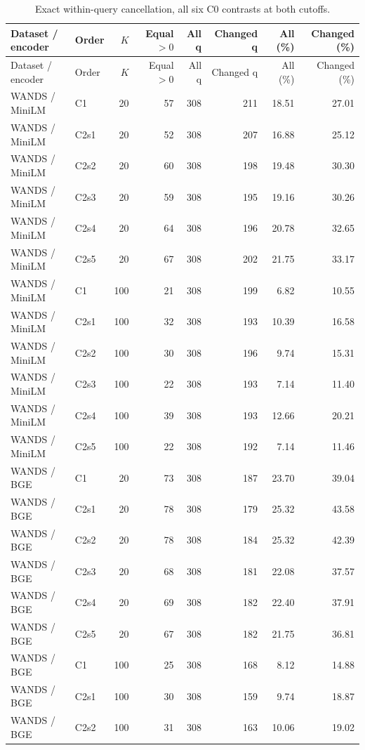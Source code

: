 \begin{longtable}{llrrrrrr}
\caption{Exact within-query cancellation, all six C0 contrasts at both cutoffs.}\\
\toprule
Dataset / encoder & Order & $K$ & Equal $>0$ & All q & Changed q & All (\%) & Changed (\%) \\
\midrule\endfirsthead
\toprule
Dataset / encoder & Order & $K$ & Equal $>0$ & All q & Changed q & All (\%) & Changed (\%) \\
\midrule\endhead
WANDS / MiniLM & C1 & 20 & 57 & 308 & 211 & 18.51 & 27.01 \\
WANDS / MiniLM & C2s1 & 20 & 52 & 308 & 207 & 16.88 & 25.12 \\
WANDS / MiniLM & C2s2 & 20 & 60 & 308 & 198 & 19.48 & 30.30 \\
WANDS / MiniLM & C2s3 & 20 & 59 & 308 & 195 & 19.16 & 30.26 \\
WANDS / MiniLM & C2s4 & 20 & 64 & 308 & 196 & 20.78 & 32.65 \\
WANDS / MiniLM & C2s5 & 20 & 67 & 308 & 202 & 21.75 & 33.17 \\
WANDS / MiniLM & C1 & 100 & 21 & 308 & 199 & 6.82 & 10.55 \\
WANDS / MiniLM & C2s1 & 100 & 32 & 308 & 193 & 10.39 & 16.58 \\
WANDS / MiniLM & C2s2 & 100 & 30 & 308 & 196 & 9.74 & 15.31 \\
WANDS / MiniLM & C2s3 & 100 & 22 & 308 & 193 & 7.14 & 11.40 \\
WANDS / MiniLM & C2s4 & 100 & 39 & 308 & 193 & 12.66 & 20.21 \\
WANDS / MiniLM & C2s5 & 100 & 22 & 308 & 192 & 7.14 & 11.46 \\
WANDS / BGE & C1 & 20 & 73 & 308 & 187 & 23.70 & 39.04 \\
WANDS / BGE & C2s1 & 20 & 78 & 308 & 179 & 25.32 & 43.58 \\
WANDS / BGE & C2s2 & 20 & 78 & 308 & 184 & 25.32 & 42.39 \\
WANDS / BGE & C2s3 & 20 & 68 & 308 & 181 & 22.08 & 37.57 \\
WANDS / BGE & C2s4 & 20 & 69 & 308 & 182 & 22.40 & 37.91 \\
WANDS / BGE & C2s5 & 20 & 67 & 308 & 182 & 21.75 & 36.81 \\
WANDS / BGE & C1 & 100 & 25 & 308 & 168 & 8.12 & 14.88 \\
WANDS / BGE & C2s1 & 100 & 30 & 308 & 159 & 9.74 & 18.87 \\
WANDS / BGE & C2s2 & 100 & 31 & 308 & 163 & 10.06 & 19.02 \\

\end{longtable}
